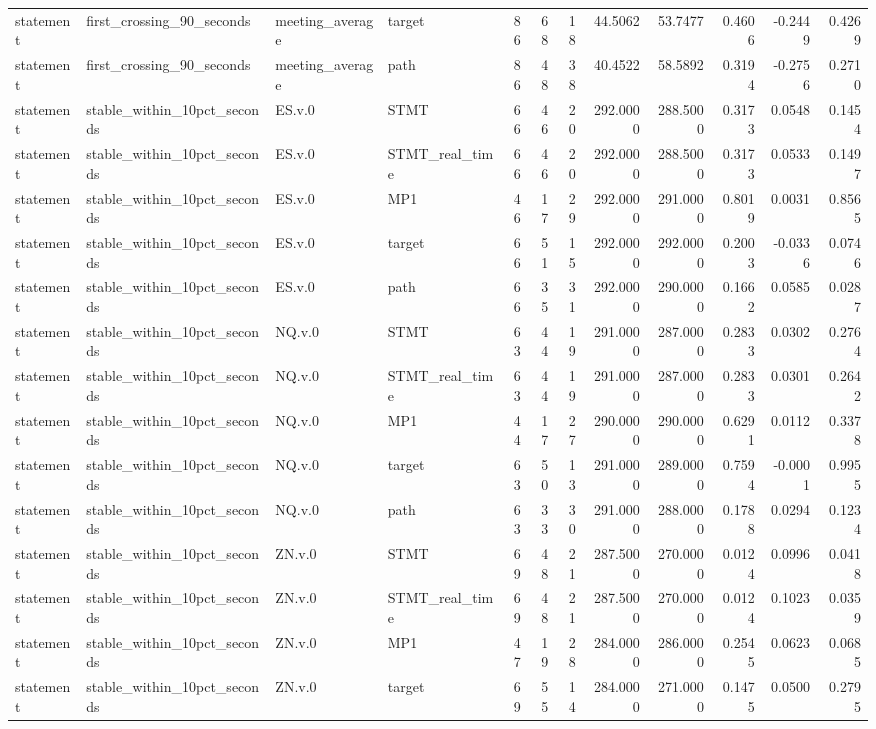 \begin{tabular}{llllrrrrrrrr}
statement & first_crossing_90_seconds & meeting_average & target & 86 & 68 & 18 & 44.5062 & 53.7477 & 0.4606 & -0.2449 & 0.4269 \\
statement & first_crossing_90_seconds & meeting_average & path & 86 & 48 & 38 & 40.4522 & 58.5892 & 0.3194 & -0.2756 & 0.2710 \\
statement & stable_within_10pct_seconds & ES.v.0 & STMT & 66 & 46 & 20 & 292.0000 & 288.5000 & 0.3173 & 0.0548 & 0.1454 \\
statement & stable_within_10pct_seconds & ES.v.0 & STMT_real_time & 66 & 46 & 20 & 292.0000 & 288.5000 & 0.3173 & 0.0533 & 0.1497 \\
statement & stable_within_10pct_seconds & ES.v.0 & MP1 & 46 & 17 & 29 & 292.0000 & 291.0000 & 0.8019 & 0.0031 & 0.8565 \\
statement & stable_within_10pct_seconds & ES.v.0 & target & 66 & 51 & 15 & 292.0000 & 292.0000 & 0.2003 & -0.0336 & 0.0746 \\
statement & stable_within_10pct_seconds & ES.v.0 & path & 66 & 35 & 31 & 292.0000 & 290.0000 & 0.1662 & 0.0585 & 0.0287 \\
statement & stable_within_10pct_seconds & NQ.v.0 & STMT & 63 & 44 & 19 & 291.0000 & 287.0000 & 0.2833 & 0.0302 & 0.2764 \\
statement & stable_within_10pct_seconds & NQ.v.0 & STMT_real_time & 63 & 44 & 19 & 291.0000 & 287.0000 & 0.2833 & 0.0301 & 0.2642 \\
statement & stable_within_10pct_seconds & NQ.v.0 & MP1 & 44 & 17 & 27 & 290.0000 & 290.0000 & 0.6291 & 0.0112 & 0.3378 \\
statement & stable_within_10pct_seconds & NQ.v.0 & target & 63 & 50 & 13 & 291.0000 & 289.0000 & 0.7594 & -0.0001 & 0.9955 \\
statement & stable_within_10pct_seconds & NQ.v.0 & path & 63 & 33 & 30 & 291.0000 & 288.0000 & 0.1788 & 0.0294 & 0.1234 \\
statement & stable_within_10pct_seconds & ZN.v.0 & STMT & 69 & 48 & 21 & 287.5000 & 270.0000 & 0.0124 & 0.0996 & 0.0418 \\
statement & stable_within_10pct_seconds & ZN.v.0 & STMT_real_time & 69 & 48 & 21 & 287.5000 & 270.0000 & 0.0124 & 0.1023 & 0.0359 \\
statement & stable_within_10pct_seconds & ZN.v.0 & MP1 & 47 & 19 & 28 & 284.0000 & 286.0000 & 0.2545 & 0.0623 & 0.0685 \\
statement & stable_within_10pct_seconds & ZN.v.0 & target & 69 & 55 & 14 & 284.0000 & 271.0000 & 0.1475 & 0.0500 & 0.2795 \\

\end{tabular}
